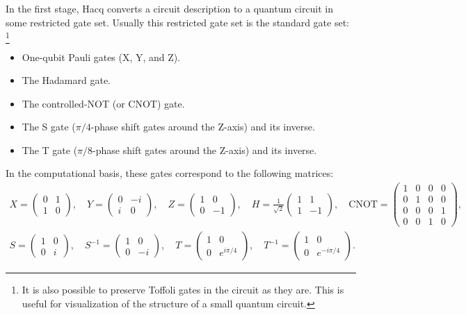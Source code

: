 \documentclass[11pt]{article}
\begin{document}
In the first stage, Hacq converts a circuit description
to a quantum circuit in some restricted gate set.
Usually this restricted gate set is the standard gate set:
\footnote{It is also possible to preserve Toffoli gates in the circuit as they are.
  This is useful for visualization of the structure of a small quantum circuit.}
\begin{itemize}
\item One-qubit Pauli gates (X, Y, and Z).
\item The Hadamard gate.
\item The controlled-NOT (or CNOT) gate.
\item The S gate ($\pi/4$-phase shift gates around the Z-axis) and its inverse.
\item The T gate ($\pi/8$-phase shift gates around the Z-axis) and its inverse.
\end{itemize}
In the computational basis, these gates correspond to the following matrices:
\begin{gather*}
  X=\begin{pmatrix}
    0 & 1 \\
    1 & 0
  \end{pmatrix}, \quad
  Y=\begin{pmatrix}
    0 & -i \\
    i & 0
  \end{pmatrix}, \quad
  Z=\begin{pmatrix}
    1 & 0 \\
    0 & -1
  \end{pmatrix}, \quad
  H=\frac{1}{\sqrt2}\begin{pmatrix}
    1 & 1 \\
    1 & -1
  \end{pmatrix}, \quad
  \mathrm{CNOT}=\begin{pmatrix}
    1 & 0 & 0 & 0 \\
    0 & 1 & 0 & 0 \\
    0 & 0 & 0 & 1 \\
    0 & 0 & 1 & 0
  \end{pmatrix},
  \\
  S=\begin{pmatrix}
    1 & 0 \\
    0 & i
  \end{pmatrix}, \quad
  S^{-1}=\begin{pmatrix}
    1 & 0 \\
    0 & -i
  \end{pmatrix}, \quad
  T=\begin{pmatrix}
    1 & 0 \\
    0 & e^{i\pi/4}
  \end{pmatrix}, \quad
  T^{-1}=\begin{pmatrix}
    1 & 0 \\
    0 & e^{-i\pi/4}
  \end{pmatrix}.
\end{gather*}
\end{document}
